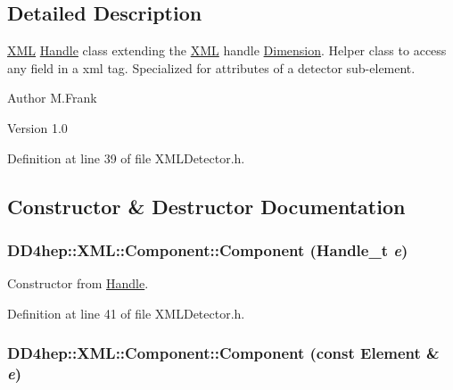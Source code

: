 \subsection{Detailed Description}
\hyperlink{namespace_d_d4hep_1_1_x_m_l}{XML} \hyperlink{class_d_d4hep_1_1_handle}{Handle} class extending the \hyperlink{namespace_d_d4hep_1_1_x_m_l}{XML} handle \hyperlink{struct_d_d4hep_1_1_x_m_l_1_1_dimension}{Dimension}. Helper class to access any field in a xml tag. Specialized for attributes of a detector sub-\/element.

\begin{DoxyAuthor}{Author}
M.Frank 
\end{DoxyAuthor}
\begin{DoxyVersion}{Version}
1.0 
\end{DoxyVersion}


Definition at line 39 of file XMLDetector.h.

\subsection{Constructor \& Destructor Documentation}
\hypertarget{struct_d_d4hep_1_1_x_m_l_1_1_component_aad3b73878abe65d69d7e53b4c2b043a0}{
\subsubsection[{Component}]{\setlength{\rightskip}{0pt plus 5cm}DD4hep::XML::Component::Component ({\bf Handle\_\-t} {\em e})}}
\label{struct_d_d4hep_1_1_x_m_l_1_1_component_aad3b73878abe65d69d7e53b4c2b043a0}


Constructor from \hyperlink{class_d_d4hep_1_1_handle}{Handle}. 

Definition at line 41 of file XMLDetector.h.\hypertarget{struct_d_d4hep_1_1_x_m_l_1_1_component_ab53e39ae951e177a0dc7e608611848a0}{
\subsubsection[{Component}]{\setlength{\rightskip}{0pt plus 5cm}DD4hep::XML::Component::Component (const {\bf Element} \& {\em e})}}
\label{struct_d_d4hep_1_1_x_m_l_1_1_component_ab53e39ae951e177a0dc7e608611848a0}



